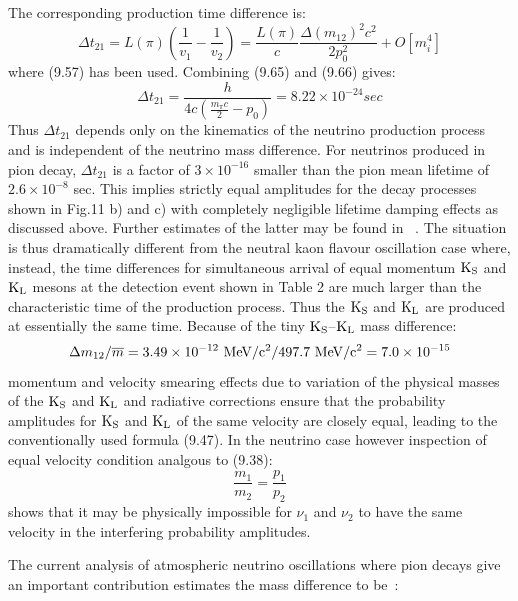 \documentclass [12pt]{article}
\begin{document}
{ The corresponding production time difference is:
    \begin{equation}
     \Delta t_{21} =  L(\pi)\left(\frac{1}{v_1}-\frac{1}{v_2}\right) 
       = \frac{L(\pi)}{c} \frac{\Delta(m_{12})^2 c^2}{2 p_0^2}+ O[m_i^4]
     \end{equation}
     where (9.57) has been used. Combining (9.65) and (9.66) gives:
     \begin{equation}
      \Delta t_{21} = \frac{h}{4 c(\frac{m_{\pi} c}{2}-p_0)} = 8.22 \times 10^{-24} sec
      \end{equation}
 Thus $ \Delta t_{21}$ depends only on the kinematics of the neutrino production process 
   and is independent of the neutrino mass difference. For neutrinos produced in pion decay,
  $ \Delta t_{21}$ is a factor of $3 \times 10^{-16}$ smaller than the pion mean lifetime
   of $2.6 \times 10^{-8}$ sec. This implies strictly equal amplitudes for the decay processes
   shown in Fig.11 b) and c) with completely negligible lifetime damping effects as discussed 
  above. Further estimates of the latter may be found in ~\cite{JHF2}. The situation is thus
  dramatically different from the neutral kaon flavour oscillation case where, instead, the
  time differences for simultaneous arrival of equal momentum  ${\rm K_S}$ and ${\rm K_L}$ mesons
  at the detection event shown in Table 2 are much larger than the characteristic time of
  the production process. Thus the ${\rm K_S}$ and ${\rm K_L}$ are produced at essentially
  the same time. Because of the tiny ${\rm K_S}$--${\rm K_L}$ mass difference:
  \[  \Delta m_{12}/\overline{m} = 3.49 \times 10^{-12} {\rm~ MeV/c^2}/
       497.7 {\rm~ MeV/c^2} = 7.0 \times 10^{-15} \]
    momentum and velocity smearing effects due to variation of the physical masses of the
     ${\rm K_S}$ and ${\rm K_L}$ and radiative corrections ensure that the  probability amplitudes
     for  ${\rm K_S}$ and ${\rm K_L}$ of the same velocity are closely equal, leading to the 
     conventionally used formula (9.47). In the neutrino case however inspection of
      equal velocity condition analgous to (9.38):
      \begin{equation}
     \frac{m_1}{m_2} = \frac{p_1}{p_2}
      \end{equation}
   shows that it may be physically impossible for $\nu_1$ and $\nu_2$ to have the same velocity
   in the interfering probability amplitudes. 
   \par The current analysis of atmospheric neutrino oscillations where pion decays give
    an important contribution estimates the mass difference to be~\cite{Kays04}:
}
\end{document}
